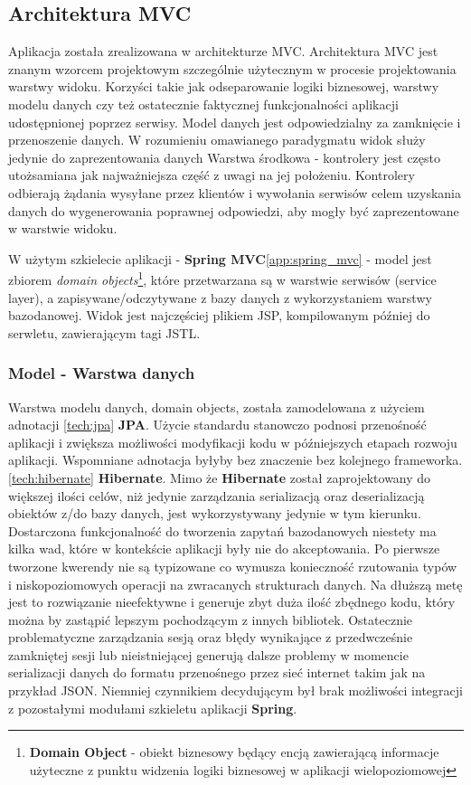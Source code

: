 	\subsection{Architektura MVC}
		Aplikacja została zrealizowana w architekturze MVC. Architektura MVC jest znanym wzorcem projektowym
		szczególnie użytecznym w procesie projektowania warstwy widoku. Korzyści takie jak odseparowanie logiki biznesowej,
		warstwy modelu danych czy też ostatecznie faktycznej funkcjonalności aplikacji udostępnionej poprzez serwisy. 
		Model danych jest odpowiedzialny za zamknięcie i przenoszenie danych. W rozumieniu omawianego paradygmatu widok służy
		jedynie do zaprezentowania danych Warstwa środkowa - kontrolery jest często utożsamiana jak najważniejsza część z uwagi
		na jej położeniu. Kontrolery odbierają żądania wysyłane przez klientów i wywołania serwisów celem uzyskania danych
		do wygenerowania poprawnej odpowiedzi, aby mogły być zaprezentowane w warstwie widoku\cite{spring_recipies}.
		
		W użytym szkielecie aplikacji - \textbf{Spring MVC}\ref{app:spring_mvc} - model jest zbiorem \textit{domain objects}\footnote{
		\textbf{Domain Object} - obiekt biznesowy będący encją zawierającą informacje użyteczne z punktu widzenia logiki biznesowej w 
		aplikacji wielopoziomowej}, które przetwarzana są w warstwie serwisów (service layer), a zapisywane/odczytywane z bazy danych
		z wykorzystaniem warstwy bazodanowej. Widok jest najczęściej plikiem JSP, kompilowanym później do serwletu, zawierającym
		tagi JSTL.
		
		\subsubsection{Model - Warstwa danych}
			Warstwa modelu danych, domain objects, została zamodelowana z użyciem adnotacji \ref{tech:jpa} \textbf{JPA}. Użycie 
			standardu stanowczo podnosi przenośność aplikacji i zwiększa możliwości modyfikacji kodu w późniejszych
			etapach rozwoju aplikacji. Wspomniane adnotacja byłyby bez znaczenie bez kolejnego frameworka. \ref{tech:hibernate} \textbf{Hibernate}.
			Mimo że \textbf{Hibernate} został zaprojektowany do większej ilości celów, niż jedynie zarządzania serializacją oraz
			deserializacją obiektów z/do bazy danych, jest wykorzystywany jedynie w tym kierunku. Dostarczona funkcjonalność do tworzenia
			zapytań bazodanowych niestety ma kilka wad, które w kontekście aplikacji były nie do akceptowania. Po pierwsze tworzone
			kwerendy nie są typizowane co wymusza konieczność rzutowania typów i niskopoziomowych operacji na zwracanych strukturach
			danych. Na dłuższą metę jest to rozwiązanie nieefektywne i generuje zbyt duża ilość zbędnego kodu, który można by zastąpić
			lepszym pochodzącym z innych bibliotek. Ostatecznie problematyczne zarządzania sesją oraz błędy wynikające z przedwcześnie
			zamkniętej sesji lub nieistniejącej generują dalsze problemy w momencie serializacji danych do formatu przenośnego przez sieć
			internet takim jak na przykład JSON. Niemniej czynnikiem decydującym był brak możliwości integracji z pozostałymi modułami 
			szkieletu aplikacji \textbf{Spring}.
		
